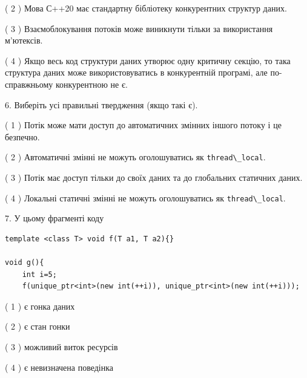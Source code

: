 \documentclass[12pt, ukrainian]{article}
\def\code#1{\Verb!#1!}
\begin{document}
\begin {large}
{( 2 ) Мова С++20 має стандартну бібліотеку конкурентних структур даних.%

( 3 ) Взаємоблокування потоків може виникнути тільки за використання м’ютексів.%

( 4 ) Якщо весь код структури даних утворює одну критичну секцію, то така структура даних може використовуватись в конкурентній програмі, але по-справжньо\-му конкурентною не є.%
\newpage



\vspace{5mm}
6. Виберіть усі правильні твердження (якщо такі є).\par
\vspace{2mm}

( 1 ) Потік може мати доступ до автоматичних змінних іншого потоку і це безпечно.%

( 2 ) Автоматичні змінні не можуть оголошуватись як \code{thread\_local}.%

( 3 ) Потік має доступ тільки до своїх даних та до глобальних статичних даних.%

( 4 ) Локальні статичні змінні не можуть оголошуватись як \code{thread\_local}.%


\vspace{5mm}
7. У цьому фрагменті коду
\begin{verbatim}
template <class T> void f(T a1, T a2){}

void g(){
    int i=5;
    f(unique_ptr<int>(new int(++i)), unique_ptr<int>(new int(++i)));
\end{verbatim}

( 1 ) є гонка даних%

( 2 ) є стан гонки%

( 3 ) можливий виток ресурсів%

( 4 ) є невизначена поведінка%
}
\end {large}
\end{document}
